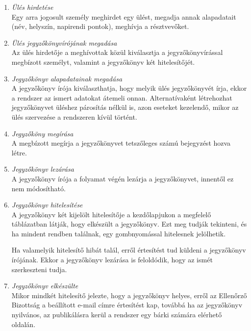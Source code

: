 \documentclass[a4paper,12pt,oneside]{report}
\begin{document}
\begin{enumerate}
  \item \emph{Ülés hirdetése}\\
    Egy arra jogosult személy meghirdet egy ülést, megadja annak alapadatait (név, helyszín, napirendi pontok), meghívja a résztvevőket.
    
  \item \emph{Ülés jegyzőkönyvírójának megadása}\\
    Az ülés hirdetője a meghívottak közül kiválasztja a jegyzőkönyvírással megbízott személyt, valamint a jegyzőkönyv két hitelesítőjét.
    
  \item \emph{Jegyzőkönyv alapadatainak megadása}\\
    A jegyzőkönyv írója kiválaszthatja, hogy melyik ülés jegyzőkönyvét írja, ekkor a rendszer az ismert adatokat átemeli onnan. Alternatívaként létrehozhat jegyzőkönyvet üléshez párosítás nélkül is, azon eseteket kezelendő, mikor az ülés szervezése a rendszeren kívül történt.

  \item \emph{Jegyzőköny megírása}\\
    A megbízott megírja a jegyzőkönyvet tetszőleges számú bejegyzést hozva létre.
    
  \item \emph{Jegyzőkönyv lezárása}\\
    A jegyzőkönyv írója a folyamat végén lezárja a jegyzőkönyvet, innentől ez nem módosítható.

  \item \emph{Jegyzőkönyv hitelesítése}\\
    A jegyzőkönyv két kijelölt hitelesítője a kezdőlapjukon a megfelelő táblázatban látják, hogy elkészült a jegyzőkönyv. Ezt meg tudják tekinteni, és ha mindent rendben találnak, egy gombnyomással hitelesnek jelölhetik.

    Ha valamelyik hitelesítő hibát talál, erről értesítést tud küldeni a jegyzőkönyv írójának. Ekkor a jegyzőkönyv lezárása is feloldódik, hogy az ismét szerkeszteni tudja.

  \item \emph{Jegyzőkönyv elkészülte}\\
    Mikor mindkét hitelesítő jelezte, hogy a jegyzőkönyv helyes, erről az Ellenőrző Bizottság a beállított e-mail címre értesítést kap, továbbá ha az jegyzőkönyv nyilvános, az publikálásra kerül a rendszer egy bárki számára elérhető oldalán.

\end{enumerate}
\end{document}
